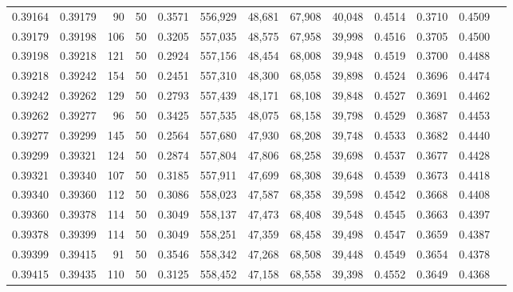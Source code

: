 \begin{tabular}{rrrrrrrrrrrrr}
0.39164 & 0.39179 &    90 &  50 &                                     0.3571 & 556,929 &  48,681 &  67,908 &  40,048 & 0.4514 & 0.3710 & 0.4509 \\
0.39179 & 0.39198 &   106 &  50 &                                     0.3205 & 557,035 &  48,575 &  67,958 &  39,998 & 0.4516 & 0.3705 & 0.4500 \\
0.39198 & 0.39218 &   121 &  50 &                                     0.2924 & 557,156 &  48,454 &  68,008 &  39,948 & 0.4519 & 0.3700 & 0.4488 \\
0.39218 & 0.39242 &   154 &  50 &                                     0.2451 & 557,310 &  48,300 &  68,058 &  39,898 & 0.4524 & 0.3696 & 0.4474 \\
0.39242 & 0.39262 &   129 &  50 &                                     0.2793 & 557,439 &  48,171 &  68,108 &  39,848 & 0.4527 & 0.3691 & 0.4462 \\
0.39262 & 0.39277 &    96 &  50 &                                     0.3425 & 557,535 &  48,075 &  68,158 &  39,798 & 0.4529 & 0.3687 & 0.4453 \\
0.39277 & 0.39299 &   145 &  50 &                                     0.2564 & 557,680 &  47,930 &  68,208 &  39,748 & 0.4533 & 0.3682 & 0.4440 \\
0.39299 & 0.39321 &   124 &  50 &                                     0.2874 & 557,804 &  47,806 &  68,258 &  39,698 & 0.4537 & 0.3677 & 0.4428 \\
0.39321 & 0.39340 &   107 &  50 &                                     0.3185 & 557,911 &  47,699 &  68,308 &  39,648 & 0.4539 & 0.3673 & 0.4418 \\
0.39340 & 0.39360 &   112 &  50 &                                     0.3086 & 558,023 &  47,587 &  68,358 &  39,598 & 0.4542 & 0.3668 & 0.4408 \\
0.39360 & 0.39378 &   114 &  50 &                                     0.3049 & 558,137 &  47,473 &  68,408 &  39,548 & 0.4545 & 0.3663 & 0.4397 \\
0.39378 & 0.39399 &   114 &  50 &                                     0.3049 & 558,251 &  47,359 &  68,458 &  39,498 & 0.4547 & 0.3659 & 0.4387 \\
0.39399 & 0.39415 &    91 &  50 &                                     0.3546 & 558,342 &  47,268 &  68,508 &  39,448 & 0.4549 & 0.3654 & 0.4378 \\
0.39415 & 0.39435 &   110 &  50 &                                     0.3125 & 558,452 &  47,158 &  68,558 &  39,398 & 0.4552 & 0.3649 & 0.4368 \\

\end{tabular}
